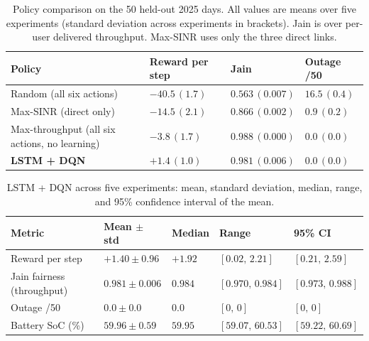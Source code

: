 \documentclass[conference]{IEEEtran}
\begin{document}
\begin{table}[t]
\centering
\caption{Policy comparison on the 50 held-out 2025 days. All values are means over five experiments (standard deviation across experiments in brackets). Jain is over per-user delivered throughput. Max-SINR uses only the three direct links.}
\label{tab:dqn-all-policies}
{\scriptsize\setlength{\tabcolsep}{3pt}
\begin{tabularx}{\columnwidth}{|>{\raggedright\arraybackslash}X|>{\centering\arraybackslash}X|>{\centering\arraybackslash}X|>{\centering\arraybackslash}X|}
\hline
\textbf{Policy} & \textbf{Reward per step} & \textbf{Jain} & \textbf{Outage /50} \\
\hline
Random (all six actions) & $-40.5\,(1.7)$ & $0.563\,(0.007)$ & $16.5\,(0.4)$ \\
\hline
Max-SINR (direct only) & $-14.5\,(2.1)$ & $0.866\,(0.002)$ & $0.9\,(0.2)$ \\
\hline
Max-throughput (all six actions, no learning) & $-3.8\,(1.7)$ & $\mathbf{0.988}\,(0.000)$ & $\mathbf{0.0}\,(0.0)$ \\
\hline
\textbf{LSTM + DQN} & $\mathbf{+1.4}\,(1.0)$ & $0.981\,(0.006)$ & $\mathbf{0.0}\,(0.0)$ \\
\hline
\end{tabularx}}
\end{table}

\begin{table}[t]
\centering
\caption{LSTM + DQN across five experiments: mean, standard deviation, median, range, and 95\% confidence interval of the mean.}
\label{tab:dqn-seed-stats}
{\scriptsize\setlength{\tabcolsep}{2.5pt}
\begin{tabularx}{\columnwidth}{|>{\raggedright\arraybackslash}X|>{\centering\arraybackslash}X|>{\centering\arraybackslash}X|>{\centering\arraybackslash}X|>{\centering\arraybackslash}X|}
\hline
\textbf{Metric} & \textbf{Mean $\pm$ std} & \textbf{Median} & \textbf{Range} & \textbf{95\% CI} \\
\hline
Reward per step & $+1.40\pm0.96$ & $+1.92$ & $[0.02,\,2.21]$ & $[0.21,\,2.59]$ \\
\hline
Jain fairness (throughput) & $0.981\pm0.006$ & $0.984$ & $[0.970,\,0.984]$ & $[0.973,\,0.988]$ \\
\hline
Outage /50 & $0.0\pm0.0$ & $0.0$ & $[0,\,0]$ & $[0,\,0]$ \\
\hline
Battery SoC (\%) & $59.96\pm0.59$ & $59.95$ & $[59.07,\,60.53]$ & $[59.22,\,60.69]$ \\
\hline
\end{tabularx}}
\end{table}
\end{document}
